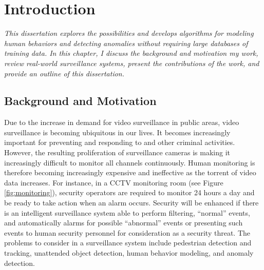 \setlength{\footskip}{8mm}

\chapter{Introduction} 

\textit{This dissertation explores the possibilities and develops
algorithms for modeling human behaviors and detecting anomalies
without requiring large databases of training data. In this chapter, I
discuss the background \DIFaddbegin {}\DIFaddend and motivation \DIFdelbegin {}\DIFdelend \DIFaddbegin {}\DIFaddend my work\DIFaddbegin {}\DIFaddend , 
\DIFaddbegin {}\DIFaddend review real-world surveillance systems, present the contributions of 
the work, and provide an outline of this dissertation.}

\section{Background and Motivation}

Due to the increase in demand for video surveillance in public areas,
video surveillance is becoming ubiquitous in our lives. It becomes
increasingly important for preventing and responding to \DIFdelbegin {}\DIFdelend \DIFaddbegin {}\DIFaddend and other criminal activities. However, the resulting proliferation of
surveillance cameras is making it increasingly difficult to monitor
all channels continuously. Human monitoring is therefore becoming
increasingly expensive and ineffective as the torrent of video data
increases. For instance, in a CCTV monitoring room (see
Figure \ref{fig:monitoring}), security operators are required to
monitor 24 hours a day and be ready to take action when an alarm
occurs. Security will be enhanced if there is an intelligent
surveillance system able to perform filtering, \DIFdelbegin {}\DIFdelend \DIFaddbegin {}\DIFaddend ``normal''
events, and automatically \DIFdelbegin {}\DIFdelend \DIFaddbegin {}\DIFaddend alarms for possible ``abnormal''
events or presenting such events to human security personnel for
consideration as a security threat. The problems to consider in a
surveillance system include pedestrian detection and tracking,
unattended object detection, human behavior modeling, and anomaly
detection.

